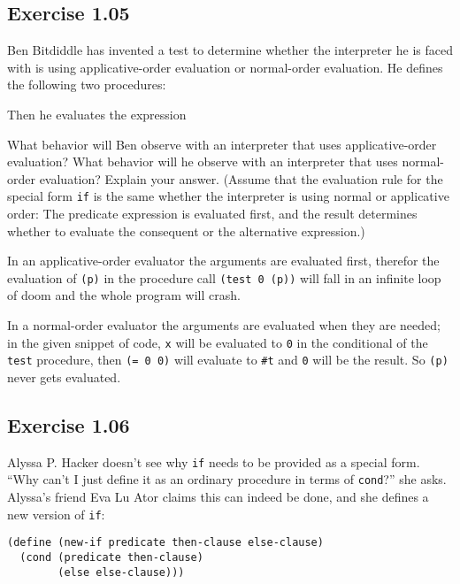 \documentclass[letterpaper, leqno]{article}
\begin{document}
\subsection*{Exercise 1.05}
Ben Bitdiddle has invented a test to determine whether the interpreter he is faced with is using applicative-order evaluation or normal-order evaluation. He defines the following two procedures:



Then he evaluates the expression



What behavior will Ben observe with an interpreter that uses applicative-order evaluation? What behavior will he observe with an interpreter that uses normal-order evaluation? Explain your answer. (Assume that the evaluation rule for the special form \texttt{if} is the same whether the interpreter is using normal or applicative order: The predicate expression is evaluated first, and the result determines whether to evaluate the consequent or the alternative expression.)

\bigskip

\textcolor{answer}{
  In an applicative-order evaluator the arguments are evaluated first, therefor the evaluation of \texttt{(p)} in the procedure call \texttt{(test 0 (p))} will fall in an infinite loop of doom and the whole program will crash.
}

\textcolor{answer}{
  In a normal-order evaluator the arguments are evaluated when they are needed; in the given snippet of code, \texttt{x} will be evaluated to \texttt{0} in the conditional of the \texttt{test} procedure, then \texttt{(= 0 0)} will evaluate to \texttt{\#t} and \texttt{0} will be the result. So \texttt{(p)} never gets evaluated.
}

\subsection*{Exercise 1.06}
Alyssa P. Hacker doesn't see why \texttt{if} needs to be provided as a special form. ``Why can't I just define it as an ordinary procedure in terms of \texttt{cond}?'' she asks. Alyssa's friend Eva Lu Ator claims this can indeed be done, and she defines a new version of \texttt{if}:

\begin{verbatim}
(define (new-if predicate then-clause else-clause)
  (cond (predicate then-clause)
        (else else-clause)))
\end{verbatim}
\end{document}
